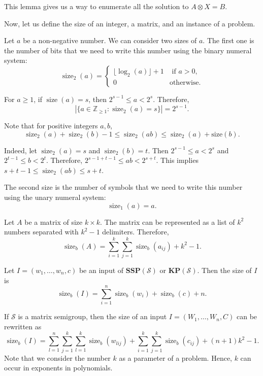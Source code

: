 \documentclass[reqno,12pt]{amsart}
\theoremstyle{definition}
\DeclareMathOperator{\size}{size}
\begin{document}
This lemma gives us a way to enumerate all the solution to $A \otimes X = B$.

Now, let us define the size of an integer, a matrix, and an instance of a problem.

Let $a$ be a non-negative number.
We can consider two sizes of $a$. The first one is the number of bits that we need to write this number using the binary numeral system:
$$
    \size_2(a) = 
    \left\{
    \begin{array}{ll}
        \lfloor \log_2(a) \rfloor + 1 & \text{ if } a > 0, \\
        0                             & \text{otherwise}.
    \end{array}
    \right.
$$

For $a \geq 1$, if $\size(a) = s$, then $2^{s - 1}\leq a < 2^s$. Therefore, 
\begin{equation}\label{NumSize}
    |\{a \in \mathbb{Z}_{\geq 1} : \size_2(a) = s \}| = 2^{s - 1}.
\end{equation}

Note that for positive integers $a, b$,
\begin{equation}\label{sizeOfProduct}
    \size_2(a) + \size_2(b) - 1 \leq \size_2(ab) \leq \size_2(a) + \mathrm{size}(b).
\end{equation}

Indeed, let $\size_2(a) = s$ and $\size_2(b) = t$. Then $2^{s-1} \leq a < 2^s$ and $2^{t-1} \leq b < 2^t$. Therefore, $2^{s - 1 + t - 1} \leq ab < 2^{s+t}$. This implies $s + t - 1 \leq\size_2(ab) \leq s + t$.

The second size is the number of symbols that we need to write this number using the unary numeral system:
$$
    \size_1(a) = a.
$$
 
Let $A$ be a matrix of size $k \times k$.
The matrix can be represented as a list of $k^2$ numbers separated with $k^2 - 1$ delimiters.
Therefore,
\begin{equation}\label{sizeMatrix}
    \size_b(A) =  \sum_{i = 1}^k\sum_{j = 1}^k \size_b(a_{ij}) + k^2 - 1.
\end{equation}

Let $I = (w_1, \ldots, w_n, c)$ be an input of $\mathbf{SSP}(\mathcal{S})$ or $\mathbf{KP}(\mathcal{S})$. 
Then the size of $I$ is 
$$
    \size_b(I) = \sum_{i = 1}^n \size_b(w_i) + \size_b(c) + n.
$$

If $\mathcal{S}$ is a matrix semigroup, then the size of an input $I = (W_1, \ldots, W_n, C)$ can be rewritten as
$$
    \size_b(I) = \sum_{l = 1}^n \sum_{j = 1}^k\sum_{l = 1}^k \size_b(w_{lij}) + \sum_{i = 1}^k\sum_{j = 1}^k \size_b(c_{ij}) + (n + 1)k^2 - 1.
$$
Note that we consider the number $k$ as a parameter of a problem. Hence, $k$ can occur in exponents in polynomials.
\end{document}

